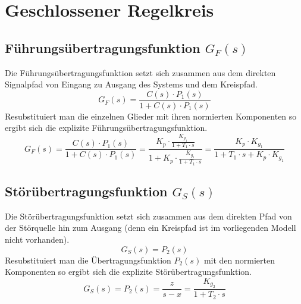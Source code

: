 \section{Geschlossener Regelkreis}

\subsection{Führungsübertragungsfunktion $G_F(s)$}
Die Führungsübertragungsfunktion setzt sich zusammen aus dem
direkten Signalpfad von Eingang zu Ausgang des Systems und dem
Kreispfad.
\[
	G_F(s) = \frac{C(s) \cdot P_1(s)}{1 + C(s) \cdot P_1(s)}
\]
Resubstituiert man die einzelnen Glieder mit ihren normierten Komponenten
so ergibt sich die explizite Führungsübertragungsfunktion.
\[
	G_F(s)
	= \frac{C(s) \cdot P_1(s)}{1 + C(s) \cdot P_1(s)}
	= \frac{
		K_p \cdot \frac{K_{g_1}}{1+T_1\cdot s}
	}{
		1 + K_p \cdot \frac{K_{g_1}}{1+T_1\cdot s}	
	}
	= \frac{K_p \cdot K_{g_1}}{1 + T_1 \cdot s + K_p \cdot K_{g_1}}
\]

\subsection{Störübertragungsfunktion $G_S(s)$}
Die Störübertragungsfunktion setzt sich zusammen aus dem direkten Pfad
von der Störquelle hin zum Ausgang (denn ein Kreispfad ist im vorliegenden
Modell nicht vorhanden).
\[
	G_S(s) = P_2(s)
\]
Resubstituiert man die Übertragungsfunktion $P_2(s)$ mit den normierten
Komponenten so ergibt sich die explizite Störübertragungsfunktion.
\[
	G_S(s) = P_2(s) = \frac{z}{s-x} = \frac{K_{g_2}}{1 + T_2 \cdot s}
\]
